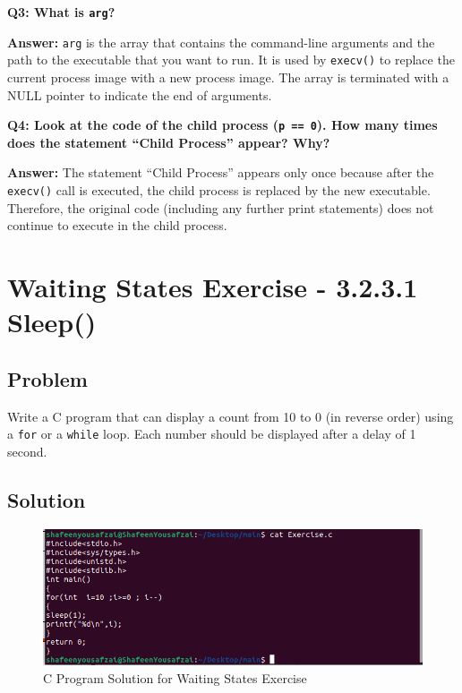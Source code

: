 \documentclass[12pt]{article}
\begin{document}
\bigskip

\textbf{Q3: What is \texttt{arg}?}

\textbf{Answer:} \texttt{arg} is the array that contains the command-line arguments and the path to the executable that you want to run. It is used by \texttt{execv()} to replace the current process image with a new process image. The array is terminated with a NULL pointer to indicate the end of arguments.

\bigskip

\textbf{Q4: Look at the code of the child process (\texttt{p == 0}). How many times does the statement “Child Process” appear? Why?}

\textbf{Answer:} The statement “Child Process” appears only once because after the \texttt{execv()} call is executed, the child process is replaced by the new executable. Therefore, the original code (including any further print statements) does not continue to execute in the child process.

\section{Waiting States Exercise - 3.2.3.1 Sleep()}

\subsection*{Problem}

Write a C program that can display a count from 10 to 0 (in reverse order) using a \texttt{for} or a \texttt{while} loop. Each number should be displayed after a delay of 1 second.

\subsection*{Solution}



\begin{figure}[H]
    \centering
    \includegraphics[width=\textwidth]{1.png} %
    \caption{C Program Solution for Waiting States Exercise}
    \label{fig:waiting_states_solution}
\end{figure}
\end{document}
